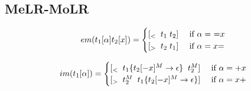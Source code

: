 \documentclass[12pt]{article}
\begin{document}
\begin{landscape}
\newpage 

\subsection{MeLR-MoLR}


\begin{equation}
em(t_1[\alpha]t_2[x])= 
\begin{cases}
[_< \;\; t_1\;t_2] & $ if $\alpha = $ =$x \\
[_> \;\; t_2\; t_1] & $ if $ \alpha = x$=$
\end{cases}
\end{equation}

\begin{equation}
im(t_1[\alpha]) =
\begin{cases}
[_< \;\; t_1\{t_2[-x]^M \rightarrow \epsilon\} \;\; t_2^M] & $ if $\alpha = +x \\
[_> \;\; t_2^M \;\; t_1\{t_2[-x]^M \rightarrow \epsilon\}] & $ if $\alpha= x+
\end{cases}
\end{equation}



\end{landscape}
\end{document}
